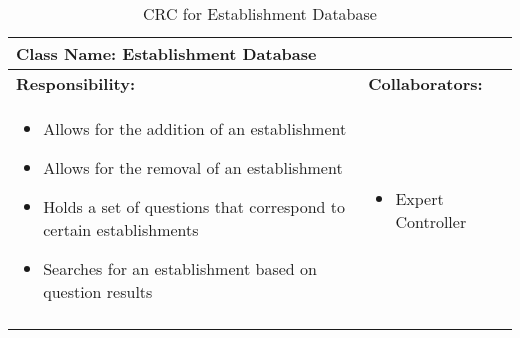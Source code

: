 \documentclass[titlepage]{article}
\begin{document}
\newpage
	\begin{longtable}{| p{} | p{} |}
			\hline
			 \multicolumn{2}{|l|}{\textbf{Class Name: Establishment Database}} \\
			\hline
			\textbf{Responsibility:} & \textbf{Collaborators:} \\
			\hline
				\begin{itemize}
					\item Allows for the addition of an establishment
					\item Allows for the removal of an establishment
					\item Holds a set of questions that correspond to certain establishments
					\item Searches for an establishment based on question results
				\end{itemize} & 
				\begin{itemize}
					\item Expert Controller
				\end{itemize} 
				\\
			\hline
		\caption{CRC for Establishment Database}
	\end{longtable}
	
	
	
\newpage

\appendix
\end{document}
